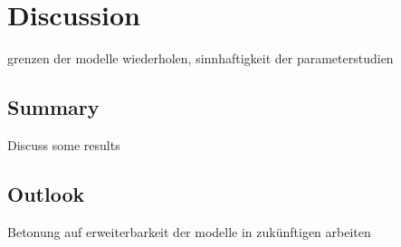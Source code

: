 \chapter{Discussion}
\label{sec:discussion}

grenzen der modelle wiederholen, sinnhaftigkeit der parameterstudien

\section{Summary}
\label{sec:summary}

Discuss some results

\section{Outlook}
\label{sec:outlook}

Betonung auf erweiterbarkeit der modelle in zukünftigen arbeiten